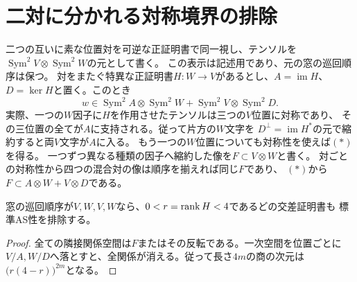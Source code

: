\section{二対に分かれる対称境界の排除}
\label{sec:two-pair-boundary}
二つの互いに素な位置対を可逆な正証明書で同一視し、テンソルを
$\operatorname{Sym}^2 V\otimes\operatorname{Sym}^2 W$の元として書く。
この表示は記述用であり、元の窓の巡回順序は保つ。
対をまたぐ特異な正証明書$H:W\to V$があるとし、$A=\operatorname{im}H$、
$D=\ker H$と置く。このとき
\[
 w\in\operatorname{Sym}^2 A\otimes\operatorname{Sym}^2 W+
        \operatorname{Sym}^2 V\otimes\operatorname{Sym}^2 D.                 \tag{*}
\]
実際、一つの$W$因子に$H$を作用させたテンソルは三つの$V$位置に対称であり、
その三位置の全てが$A$に支持される。従って片方の$W$文字を
$D^\perp=\operatorname{im}H^*$の元で縮約すると両$V$文字が$A$に入る。
もう一つの$W$位置についても対称性を使えば$(*)$を得る。
一つずつ異なる種類の因子へ縮約した像を$F\subset V\otimes W$と書く。
対ごとの対称性から四つの混合対の像は順序を揃えれば同じ$F$であり、
$(*)$から$F\subset A\otimes W+V\otimes D$である。

\begin{proposition}[交互に並ぶ二対]\label{prop:alternating-position-pairs}
窓の巡回順序が$V,W,V,W$なら、$0<r=\operatorname{rank} H<4$であるどの交差証明書も
標準AS性を排除する。
\end{proposition}
\begin{proof}
全ての隣接関係空間は$F$またはその反転である。一次空間を位置ごとに
$V/A,W/D$へ落とすと、全関係が消える。従って長さ$4m$の商の次元は
$\bigl(r(4-r)\bigr)^{2m}$となる。
\end{proof}

